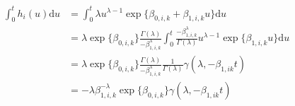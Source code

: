 \begin{align}
  \int_{0}^{t} h_{i}(u)\text{d}u &=
    \int_{0}^{t} 
      \lambda u ^{\lambda - 1} 
      \exp\{
        \beta_{0, i, k} + \beta_{1, i, k} u
      \} 
    \text{d}u \\
  &=
    \lambda
    \exp\{\beta_{0, i, k}\}
    \frac{\Gamma(\lambda)}{-\beta_{1, i, k}^{\lambda}}
    \int_{0}^{t}
      \frac{-\beta_{1, i, k}^{\lambda}}{\Gamma(\lambda)}
      u^{\lambda - 1}
      \exp\{\beta_{1, i, k} u\}
    \text{d}u \\
  &= 
    \lambda
    \exp\{\beta_{0, i, k}\}
    \frac{\Gamma(\lambda)}{-\beta_{1, i, k}^{\lambda}}
    \frac{1}{\Gamma(\lambda)}
    \gamma(\lambda, -\beta_{1, i k}t) \\
  &=
    -\lambda \beta_{1, i, k}^{-\lambda}
    \exp\{\beta_{0, i, k}\}
    \gamma(\lambda, -\beta_{1, i k}t)
  \label{eqn:submodel-two-hazard-integral}
\end{align}